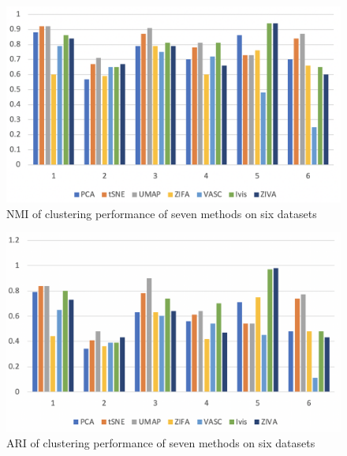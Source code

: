 \begin{figure}[htb!]
    \centering
    \includegraphics[width=1\textwidth]{figures/myfigures/nmiallf.png}
    \caption{NMI of clustering performance of seven methods on six datasets}
    \label{nmiallf}
\end{figure}

\begin{figure}[htb!]
    \centering
    \includegraphics[width=1\textwidth]{figures/myfigures/ariallf.png}
    \caption{ARI of clustering performance of seven methods on six datasets}
    \label{ariallf}
\end{figure}

\begin{table}[htb!]
\centering
\caption{NMI of clustering performance of seven methods on six datasets}
\label{nmiall}
\end{table}

